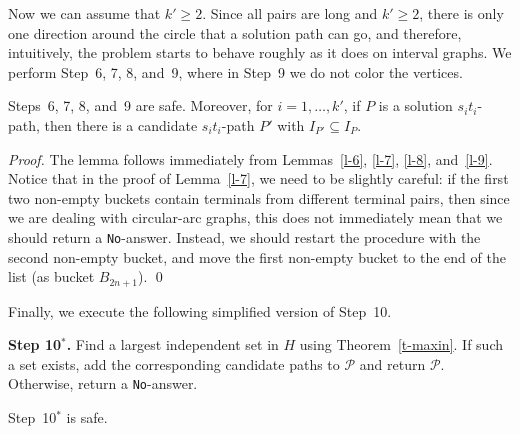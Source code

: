 \documentclass{llncs}
\newcommand{\mc}{\mathcal}
\begin{document}
Now we can assume that $k' \geq 2$. Since all pairs are long and $k'\geq 2$, there is only one direction around the circle that a solution path can go, and therefore, intuitively, the problem starts to behave roughly as it does on interval graphs. We perform Step~6, 7, 8, and~9, where in Step~9 we do not color the vertices.

\begin{lemma}\label{l-c-6789}
Steps~6, 7, 8, and~9 are safe. Moreover, for $i=1,\ldots,k'$, if $P$ is a solution $s_it_i$-path, then there is a candidate $s_it_i$-path $P'$ with $I_{P'} \subseteq I_{P}$.
\end{lemma}

\begin{proof}
The lemma follows immediately from Lemmas~\ref{l-6}, \ref{l-7}, \ref{l-8}, and~\ref{l-9}. Notice that in the proof of Lemma~\ref{l-7}, we need to be slightly careful: if the first two non-empty buckets contain terminals from different terminal pairs, then since we are dealing with circular-arc graphs, this does not immediately mean that we should return a \texttt{No}-answer. Instead, we should restart the procedure with the second non-empty bucket, and move the first non-empty bucket to the end of the list (as bucket $B_{2n+1}$).
\qed\end{proof}

Finally, we execute the following simplified version of Step~10.

\newcommand{\sten}{10$^{*}$}

\medskip
\noindent
{\bf Step \sten{}.}  Find a largest independent set in $H$ using Theorem~\ref{t-maxin}. If such a set exists, add the corresponding candidate paths to $\mc{P}$ and return $\mc{P}$. Otherwise, return a {\tt No}-answer.

\begin{lemma}\label{l-c-10}
Step~\sten{} is safe.
\end{lemma}
\end{document}
